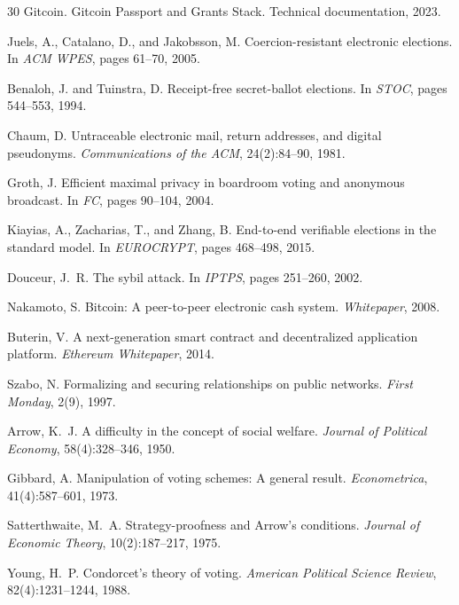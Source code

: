 \documentclass[11pt,a4paper]{article}
\begin{document}
\begin{thebibliography}{30}
Gitcoin.
\newblock Gitcoin Passport and Grants Stack.
\newblock Technical documentation, 2023.

Juels, A., Catalano, D., and Jakobsson, M.
\newblock Coercion-resistant electronic elections.
\newblock In \emph{ACM WPES}, pages 61--70, 2005.

Benaloh, J. and Tuinstra, D.
\newblock Receipt-free secret-ballot elections.
\newblock In \emph{STOC}, pages 544--553, 1994.

Chaum, D.
\newblock Untraceable electronic mail, return addresses, and digital pseudonyms.
\newblock \emph{Communications of the ACM}, 24(2):84--90, 1981.

Groth, J.
\newblock Efficient maximal privacy in boardroom voting and anonymous broadcast.
\newblock In \emph{FC}, pages 90--104, 2004.

Kiayias, A., Zacharias, T., and Zhang, B.
\newblock End-to-end verifiable elections in the standard model.
\newblock In \emph{EUROCRYPT}, pages 468--498, 2015.

Douceur, J.~R.
\newblock The sybil attack.
\newblock In \emph{IPTPS}, pages 251--260, 2002.

Nakamoto, S.
\newblock Bitcoin: A peer-to-peer electronic cash system.
\newblock \emph{Whitepaper}, 2008.

Buterin, V.
\newblock A next-generation smart contract and decentralized application platform.
\newblock \emph{Ethereum Whitepaper}, 2014.

Szabo, N.
\newblock Formalizing and securing relationships on public networks.
\newblock \emph{First Monday}, 2(9), 1997.

Arrow, K.~J.
\newblock A difficulty in the concept of social welfare.
\newblock \emph{Journal of Political Economy}, 58(4):328--346, 1950.

Gibbard, A.
\newblock Manipulation of voting schemes: A general result.
\newblock \emph{Econometrica}, 41(4):587--601, 1973.

Satterthwaite, M.~A.
\newblock Strategy-proofness and {Arrow's} conditions.
\newblock \emph{Journal of Economic Theory}, 10(2):187--217, 1975.

Young, H.~P.
\newblock Condorcet's theory of voting.
\newblock \emph{American Political Science Review}, 82(4):1231--1244, 1988.

\end{thebibliography}
\end{document}

